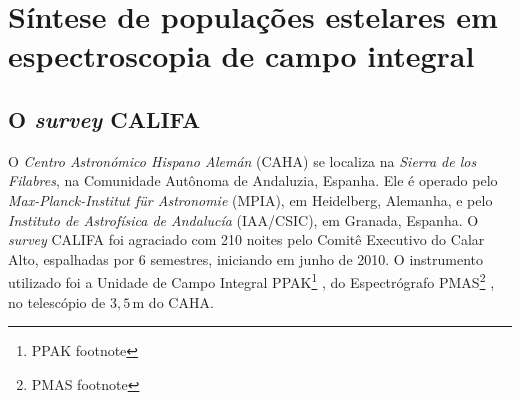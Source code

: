 


\chapter{Síntese de populações estelares em espectroscopia de campo integral}
\label{sec:ifs}


\section{O {\em survey} CALIFA}

O {\em Centro Astronómico Hispano Alemán} (CAHA) se localiza na {\em Sierra de
los Filabres}, na Comunidade Autônoma de Andaluzia, Espanha. Ele é operado pelo
{\em Max-Planck-Institut für Astronomie} (MPIA), em Heidelberg, Alemanha, e pelo
{\em Instituto de Astrofísica de Andalucía} (IAA/CSIC), em Granada, Espanha. O
{\em survey} CALIFA foi agraciado com 210 noites pelo Comitê Executivo do Calar
Alto, espalhadas por 6 semestres, iniciando em junho de 2010. O instrumento
utilizado foi a Unidade de Campo Integral PPAK\footnote{\TODO PPAK footnote}
\citep{Kelz2006}, do Espectrógrafo PMAS\footnote{\TODO PMAS footnote}
\citep{Roth2005, Roth2010}, no telescópio de $3,5\,\mathrm{m}$ do CAHA.

